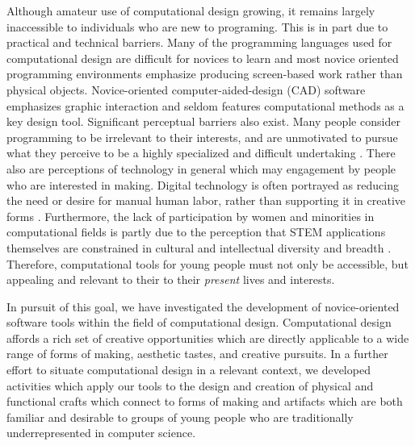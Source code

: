 \documentclass{sigchi}
\begin{document}
Although amateur use of computational design growing, it remains largely inaccessible to individuals who are new to programing. This is in part due to practical and technical barriers. Many of the programming languages used for computational design are difficult for novices to learn and most novice oriented programming environments emphasize producing screen-based work rather than physical objects. Novice-oriented computer-aided-design (CAD) software emphasizes graphic interaction and seldom features computational methods as a key design tool. Significant perceptual barriers also exist. Many people consider programming to be irrelevant to their interests, and are unmotivated to pursue what they perceive to be a highly specialized and difficult undertaking \cite{resnick1}. There also are perceptions of technology in general which may engagement by people who are interested in making. Digital technology is often portrayed as reducing the need or desire for manual human labor, rather than supporting it in creative forms \cite{rosner_craft_vs_design}. Furthermore, the lack of participation by women and minorities in computational fields is partly due to the perception that STEM applications themselves are constrained in cultural and intellectual diversity and breadth \cite{buechley_wild}. Therefore, computational tools for young people must not only be accessible, but appealing and relevant to their to their \emph{present} lives and interests.

In pursuit of this goal, we have investigated the development of novice-oriented software tools within the field of computational design. Computational design affords a rich set of creative opportunities which are directly applicable to a wide range of forms of making, aesthetic tastes, and creative pursuits. In a further effort to situate computational design in a relevant context, we developed activities which apply our tools to the design and creation of physical and functional crafts which connect to forms of making and artifacts which are both familiar and desirable to groups of young people who are traditionally underrepresented in computer science.
\end{document}
